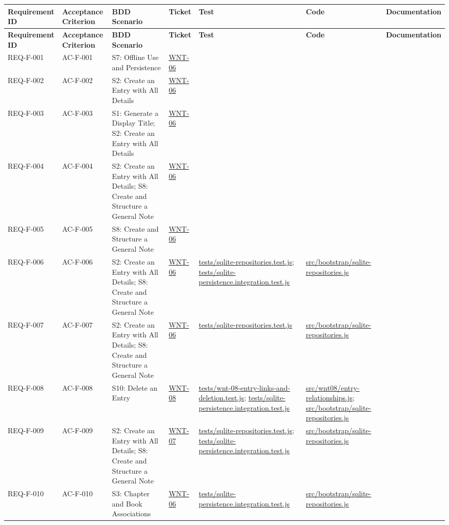 \documentclass[10pt,a4paper]{article}
\renewcommand{\texttt}[1]{\url{#1}}
\begin{document}
\small
\begin{longtable}{|L{2.5cm}|L{2.6cm}|L{4.4cm}|L{3.3cm}|L{3.3cm}|L{3.3cm}|L{3.3cm}|}
\hline
\textbf{Requirement ID} & \textbf{Acceptance Criterion} & \textbf{BDD Scenario} & \textbf{Ticket} & \textbf{Test} & \textbf{Code} & \textbf{Documentation} \\
\hline
\endfirsthead
\hline
\textbf{Requirement ID} & \textbf{Acceptance Criterion} & \textbf{BDD Scenario} & \textbf{Ticket} & \textbf{Test} & \textbf{Code} & \textbf{Documentation} \\
\hline
\endhead
REQ-F-001 & AC-F-001 & S7: Offline Use and Persistence & \texttt{WNT-06} & & & \\ \hline
REQ-F-002 & AC-F-002 & S2: Create an Entry with All Details & \texttt{WNT-06} & & & \\ \hline
REQ-F-003 & AC-F-003 & S1: Generate a Display Title; S2: Create an Entry with All Details & \texttt{WNT-06} & & & \\ \hline
REQ-F-004 & AC-F-004 & S2: Create an Entry with All Details; S8: Create and Structure a General Note & \texttt{WNT-06} & & & \\ \hline
REQ-F-005 & AC-F-005 & S8: Create and Structure a General Note & \texttt{WNT-06} & & & \\ \hline
REQ-F-006 & AC-F-006 & S2: Create an Entry with All Details; S8: Create and Structure a General Note & \texttt{WNT-06} & \texttt{tests/sqlite-repositories.test.js}; \texttt{tests/sqlite-persistence.integration.test.js} & \texttt{src/bootstrap/sqlite-repositories.js} & \\ \hline
REQ-F-007 & AC-F-007 & S2: Create an Entry with All Details; S8: Create and Structure a General Note & \texttt{WNT-06} & \texttt{tests/sqlite-repositories.test.js} & \texttt{src/bootstrap/sqlite-repositories.js} & \\ \hline
REQ-F-008 & AC-F-008 & S10: Delete an Entry & \texttt{WNT-08} & \texttt{tests/wnt-08-entry-links-and-deletion.test.js}; \texttt{tests/sqlite-persistence.integration.test.js} & \texttt{src/wnt08/entry-relationships.js}; \texttt{src/bootstrap/sqlite-repositories.js} & \\ \hline
REQ-F-009 & AC-F-009 & S2: Create an Entry with All Details; S8: Create and Structure a General Note & \texttt{WNT-07} & \texttt{tests/sqlite-repositories.test.js}; \texttt{tests/sqlite-persistence.integration.test.js} & \texttt{src/bootstrap/sqlite-repositories.js} & \\ \hline
REQ-F-010 & AC-F-010 & S3: Chapter and Book Associations & \texttt{WNT-06} & \texttt{tests/sqlite-persistence.integration.test.js} & \texttt{src/bootstrap/sqlite-repositories.js} & \\ \hline

\end{longtable}
\end{document}
